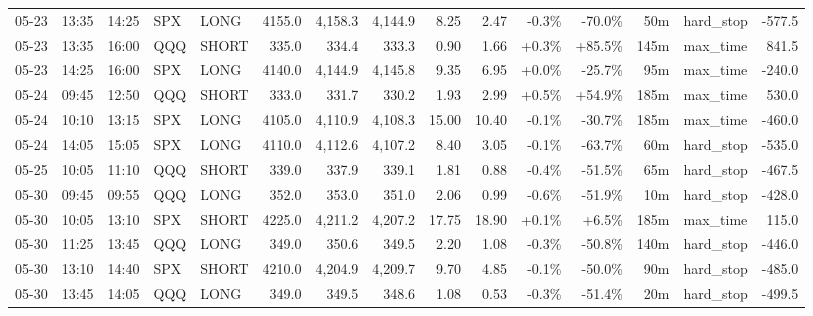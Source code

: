 \documentclass[11pt,a4paper,twoside]{article}
\begin{document}
\begin{landscape}
\begin{center}
\begin{longtable}{>{\color{txtmain}}l l l l l r r r r r r r r >{\color{txtmain}}l r}
05-23 & 13:35 & 14:25 & SPX & LONG & 4155.0 & 4,158.3 & 4,144.9 & 8.25 & 2.47 & \textcolor{lossred}{-0.3\%} & \textcolor{lossred}{-70.0\%} & 50m & hard\_stop & \textcolor{lossred}{-577.5} \\
05-23 & 13:35 & 16:00 & QQQ & SHORT & 335.0 & 334.4 & 333.3 & 0.90 & 1.66 & \textcolor{wingreen}{+0.3\%} & \textcolor{wingreen}{+85.5\%} & 145m & max\_time & \textcolor{wingreen}{841.5} \\
05-23 & 14:25 & 16:00 & SPX & LONG & 4140.0 & 4,144.9 & 4,145.8 & 9.35 & 6.95 & \textcolor{wingreen}{+0.0\%} & \textcolor{lossred}{-25.7\%} & 95m & max\_time & \textcolor{lossred}{-240.0} \\
05-24 & 09:45 & 12:50 & QQQ & SHORT & 333.0 & 331.7 & 330.2 & 1.93 & 2.99 & \textcolor{wingreen}{+0.5\%} & \textcolor{wingreen}{+54.9\%} & 185m & max\_time & \textcolor{wingreen}{530.0} \\
05-24 & 10:10 & 13:15 & SPX & LONG & 4105.0 & 4,110.9 & 4,108.3 & 15.00 & 10.40 & \textcolor{lossred}{-0.1\%} & \textcolor{lossred}{-30.7\%} & 185m & max\_time & \textcolor{lossred}{-460.0} \\
05-24 & 14:05 & 15:05 & SPX & LONG & 4110.0 & 4,112.6 & 4,107.2 & 8.40 & 3.05 & \textcolor{lossred}{-0.1\%} & \textcolor{lossred}{-63.7\%} & 60m & hard\_stop & \textcolor{lossred}{-535.0} \\
05-25 & 10:05 & 11:10 & QQQ & SHORT & 339.0 & 337.9 & 339.1 & 1.81 & 0.88 & \textcolor{lossred}{-0.4\%} & \textcolor{lossred}{-51.5\%} & 65m & hard\_stop & \textcolor{lossred}{-467.5} \\
05-30 & 09:45 & 09:55 & QQQ & LONG & 352.0 & 353.0 & 351.0 & 2.06 & 0.99 & \textcolor{lossred}{-0.6\%} & \textcolor{lossred}{-51.9\%} & 10m & hard\_stop & \textcolor{lossred}{-428.0} \\
05-30 & 10:05 & 13:10 & SPX & SHORT & 4225.0 & 4,211.2 & 4,207.2 & 17.75 & 18.90 & \textcolor{wingreen}{+0.1\%} & \textcolor{wingreen}{+6.5\%} & 185m & max\_time & \textcolor{wingreen}{115.0} \\
05-30 & 11:25 & 13:45 & QQQ & LONG & 349.0 & 350.6 & 349.5 & 2.20 & 1.08 & \textcolor{lossred}{-0.3\%} & \textcolor{lossred}{-50.8\%} & 140m & hard\_stop & \textcolor{lossred}{-446.0} \\
05-30 & 13:10 & 14:40 & SPX & SHORT & 4210.0 & 4,204.9 & 4,209.7 & 9.70 & 4.85 & \textcolor{lossred}{-0.1\%} & \textcolor{lossred}{-50.0\%} & 90m & hard\_stop & \textcolor{lossred}{-485.0} \\
05-30 & 13:45 & 14:05 & QQQ & LONG & 349.0 & 349.5 & 348.6 & 1.08 & 0.53 & \textcolor{lossred}{-0.3\%} & \textcolor{lossred}{-51.4\%} & 20m & hard\_stop & \textcolor{lossred}{-499.5} \\

\end{longtable}
\end{center}
\end{landscape}
\end{document}
